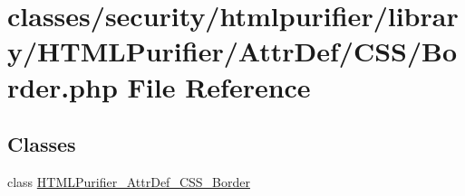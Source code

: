 \hypertarget{AttrDef_2CSS_2Border_8php}{\section{classes/security/htmlpurifier/library/\+H\+T\+M\+L\+Purifier/\+Attr\+Def/\+C\+S\+S/\+Border.php File Reference}
\label{AttrDef_2CSS_2Border_8php}
}
\subsection*{Classes}
\begin{DoxyCompactItemize}
\item 
class \hyperlink{classHTMLPurifier__AttrDef__CSS__Border}{H\+T\+M\+L\+Purifier\+\_\+\+Attr\+Def\+\_\+\+C\+S\+S\+\_\+\+Border}
\end{DoxyCompactItemize}
